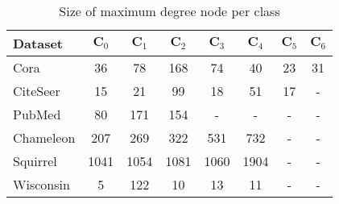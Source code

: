 \begin{table}[h] %
\center
\caption{\small Size of maximum degree node per class}
\begin{small}
\setlength{\tabcolsep}{3pt} 
\begin{tabular}{l|ccccccc}
\toprule
    \textbf{Dataset}  & $\mathbf{C}_0$ & $\mathbf{C}_1$ & $\mathbf{C}_2$ & $\mathbf{C}_3$ & $\mathbf{C}_4$ & $\mathbf{C}_5$ & $\mathbf{C}_6$ \\
    \hline

    Cora  & 36 & 78 & 168 & 74 & 40 & 23 & 31 \\    
    CiteSeer & 15 & 21 & 99 & 18 & 51 & 17 &-  \\
    PubMed & 80 & 171 & 154 &- &- &- &- \\
    Chameleon & 207 & 269 & 322 & 531 & 732 & - & - \\
    Squirrel & 1041 & 1054 & 1081 & 1060 & 1904 & - & -  \\ 
    Wisconsin & 5 & 122 & 10 & 13 & 11 & - & -  \\ 
\bottomrule
\end{tabular}
\end{small}
\label{tb:datastat_degree}
\end{table}